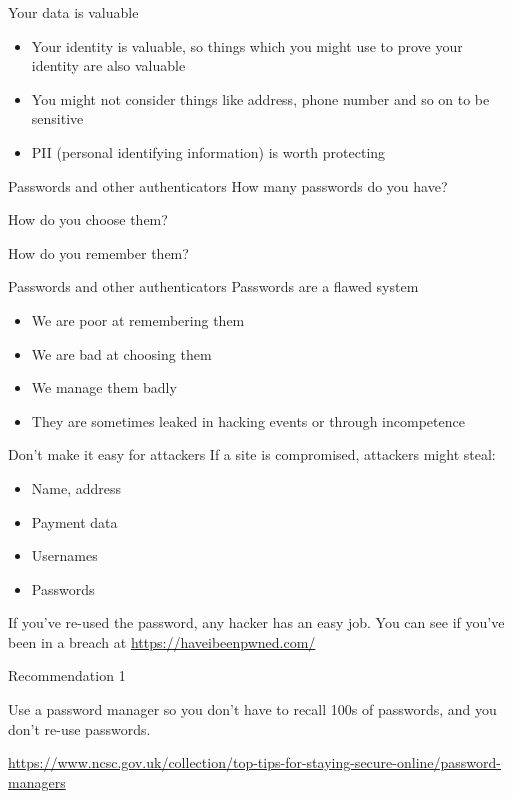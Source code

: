 \documentclass[xcolor=table]{beamer}
\begin{document}
\begin{frame}{Your data is valuable}
	\begin{itemize}
		\item Your identity is valuable, so things which you might use to prove your identity are also valuable
		\item You might not consider things like address, phone number and so on to be sensitive 
		\item PII (personal identifying information) is worth protecting
	\end{itemize}
\end{frame}
\begin{frame}{Passwords and other authenticators}
	How many passwords do you have?

	\vspace{0.5em}

	How do you choose them?

	\vspace{0.5em}

	How do you remember them?
\end{frame}
\begin{frame}{Passwords and other authenticators}
		Passwords are a flawed system
	\begin{itemize}
		\item We are poor at remembering them
		\item We are bad at choosing them
		\item We manage them badly
		\item They are sometimes leaked in hacking events or through incompetence
	\end{itemize}
\end{frame}
\begin{frame}{Don't make it easy for attackers}
	If a site is compromised, attackers might steal:
	\begin{itemize}
		\item Name, address
		\item Payment data
		\item Usernames 
		\item Passwords 
	\end{itemize}
	If you've re-used the password, any hacker has an easy job.
	\vspace{0.5em}
	You can see if you've been in a breach at \url{https://haveibeenpwned.com/}
\end{frame}
	\begin{frame}{Recommendation 1}

		Use a password manager so you don't have to recall 100s of passwords, and you don't re-use passwords. 

		\vspace{0.5em}

		\url{https://www.ncsc.gov.uk/collection/top-tips-for-staying-secure-online/password-managers}
	\end{frame}
\end{document}
